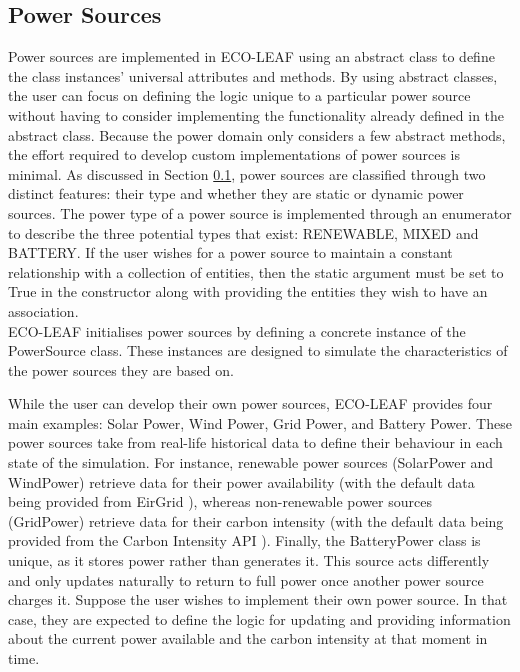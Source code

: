 \documentclass{l4proj}
\begin{document}
\subsection{Power Sources}\label{sec:power-sources}
Power sources are implemented in ECO-LEAF using an abstract class to define the class instances' universal attributes and methods.
By using abstract classes, the user can focus on defining the logic unique to a particular power source without having to consider implementing the functionality already defined in the abstract class.
Because the power domain only considers a few abstract methods, the effort required to develop custom implementations of power sources is minimal.
As discussed in Section \ref{sec:power-sources}, power sources are classified through two distinct features: their type and whether they are static or dynamic power sources.
The power type of a power source is implemented through an enumerator to describe the three potential types that exist: RENEWABLE, MIXED and BATTERY.
If the user wishes for a power source to maintain a constant relationship with a collection of entities, then the static argument must be set to True in the constructor along with providing the entities they wish to have an association.\\
ECO-LEAF initialises power sources by defining a concrete instance of the PowerSource class.
These instances are designed to simulate the characteristics of the power sources they are based on.

While the user can develop their own power sources, ECO-LEAF provides four main examples: Solar Power, Wind Power, Grid Power, and Battery Power.
These power sources take from real-life historical data to define their behaviour in each state of the simulation.
For instance, renewable power sources (SolarPower and WindPower) retrieve data for their power availability (with the default data being provided from EirGrid \citep{eirgrid}), whereas non-renewable power sources (GridPower) retrieve data for their carbon intensity (with the default data being provided from the Carbon Intensity API \citep{carbon_intensity_api}).
Finally, the BatteryPower class is unique, as it stores power rather than generates it.
This source acts differently and only updates naturally to return to full power once another power source charges it.
Suppose the user wishes to implement their own power source.
In that case, they are expected to define the logic for updating and providing information about the current power available and the carbon intensity at that moment in time.
\end{document}
